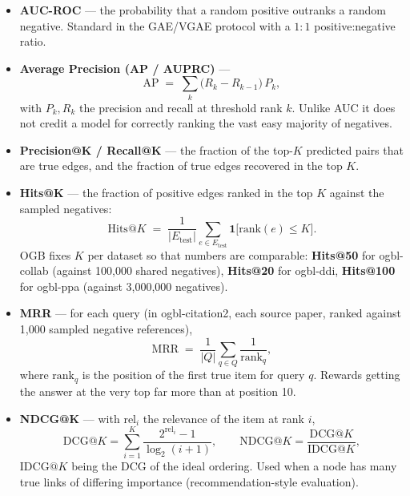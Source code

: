 \begin{itemize}[label=$\bullet$,leftmargin=1.3em]
  \item \textbf{AUC-ROC} --- the probability that a random positive outranks a random
        negative. Standard in the GAE/VGAE protocol with a $1\!:\!1$ positive:negative
        ratio.
  \item \textbf{Average Precision (AP / AUPRC)} ---
        \begin{equation}
          \mathrm{AP} \;=\; \sum_{k} \bigl(R_k - R_{k-1}\bigr)\,P_k ,
          \label{p1:eq:ap}
        \end{equation}
        with $P_k,R_k$ the precision and recall at threshold rank $k$. Unlike AUC it does
        not credit a model for correctly ranking the vast easy majority of negatives.
  \item \textbf{Precision@K / Recall@K} --- the fraction of the top-$K$ predicted pairs that
        are true edges, and the fraction of true edges recovered in the top $K$.
  \item \textbf{Hits@K} --- the fraction of positive edges ranked in the top $K$ against the
        sampled negatives:
        \begin{equation}
          \mathrm{Hits@}K \;=\; \frac{1}{|E_{\text{test}}|}
            \sum_{e\in E_{\text{test}}} \mathbf{1}\bigl[\mathrm{rank}(e) \leq K\bigr].
          \label{p1:eq:hits}
        \end{equation}
        OGB fixes $K$ per dataset so that numbers are comparable: \textbf{Hits@50} for
        ogbl-collab (against 100{,}000 shared negatives), \textbf{Hits@20} for ogbl-ddi,
        \textbf{Hits@100} for ogbl-ppa (against 3{,}000{,}000 negatives).
  \item \textbf{MRR} --- for each query (in ogbl-citation2, each source paper, ranked against
        1{,}000 sampled negative references),
        \begin{equation}
          \mathrm{MRR} \;=\; \frac{1}{|Q|}\sum_{q\in Q} \frac{1}{\mathrm{rank}_q},
          \label{p1:eq:mrr}
        \end{equation}
        where $\mathrm{rank}_q$ is the position of the first true item for query $q$.
        Rewards getting the answer at the very top far more than at position 10.
  \item \textbf{NDCG@K} --- with $\mathrm{rel}_i$ the relevance of the item at rank $i$,
        \begin{equation}
          \mathrm{DCG@}K=\sum_{i=1}^{K}\frac{2^{\mathrm{rel}_i}-1}{\log_2(i+1)},
          \qquad
          \mathrm{NDCG@}K=\frac{\mathrm{DCG@}K}{\mathrm{IDCG@}K},
          \label{p1:eq:ndcg}
        \end{equation}
        $\mathrm{IDCG@}K$ being the DCG of the ideal ordering. Used when a node has many
        true links of differing importance (recommendation-style evaluation).
\end{itemize}

